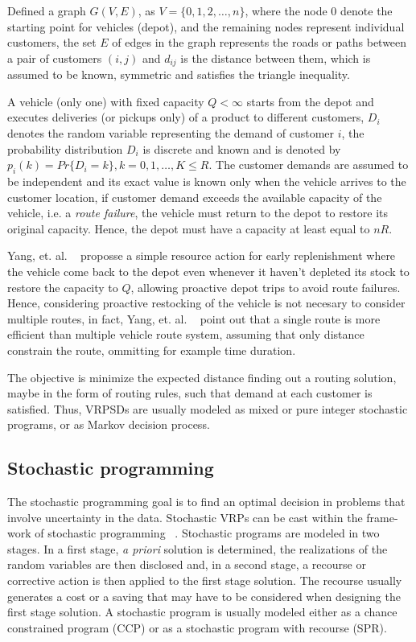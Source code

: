 Defined a graph $G(V,E)$, as $V = \{0, 1, 2,\ldots,n\}$, where the node 0 denote the starting point for vehicles (depot), and the remaining nodes represent individual customers, the set $E$ of edges in the graph represents the roads or paths between a pair of customers $(i,j)$ and $d_{ij}$ is the distance between them, which is assumed to be known, symmetric and satisfies the triangle inequality.

A vehicle (only one) with fixed capacity $Q < \infty$ starts from the depot and executes deliveries (or pickups only) of a product to different customers, $D_i$ denotes the random variable representing the demand of customer $i$, the probability distribution $D_i$ is discrete and known and is denoted by $p_i(k)= Pr\{D_i=k\}, k=0,1,\ldots,K \leq R$. The customer demands are assumed to be independent and its exact value is known only when the vehicle arrives to the customer location, if customer demand exceeds the available capacity of the vehicle, i.e. a \textit{route failure}, the vehicle must return to the depot to restore its original capacity. Hence, the depot must have a capacity at least equal to $nR$. %

Yang, et. al. ~\cite{yang_stochastic_2000} proposse a simple resource action for early replenishment where the vehicle come back to the depot even whenever it haven't depleted its stock to restore the capacity to $Q$, allowing proactive depot trips to avoid route failures. Hence, considering proactive restocking of the vehicle is not necesary to consider multiple routes, in fact, Yang, et. al. ~\cite{yang_stochastic_2000} point out that a single route is more efficient than multiple vehicle route system, assuming that only distance constrain the route, ommitting for example time duration.

The objective is minimize the expected distance finding out a routing solution, maybe in the form of routing rules, such that demand
at each customer is satisﬁed. Thus, VRPSDs are usually modeled as mixed or pure integer stochastic programs, or as Markov decision process.


\subsection{Stochastic programming}

The stochastic programming goal is to find an optimal decision in problems that involve uncertainty in the data. Stochastic VRPs can be cast within the frame-work of stochastic programming ~\cite{gendreau_stochastic_1996}. Stochastic programs are modeled in two stages. In a first stage, \textit{a priori} solution is determined, the realizations of the random variables are then disclosed and, in a second stage, a recourse or corrective action is then applied to the first stage solution. The recourse usually generates a cost or a saving that may have to be considered when designing the first stage solution. A stochastic program is usually modeled either as a chance constrained program (CCP) or as a stochastic program with recourse (SPR). 

